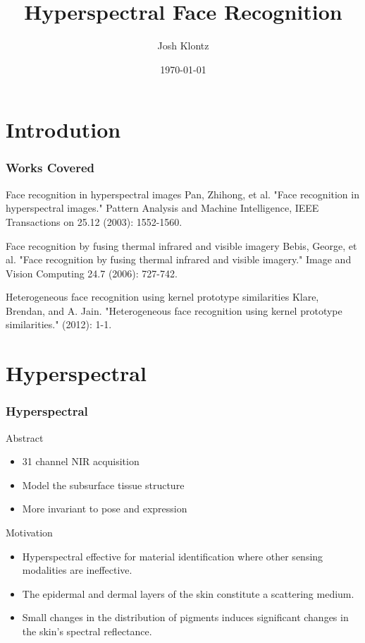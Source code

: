 \documentclass{beamer}
\title[Hyperspectral]{Hyperspectral Face Recognition}
\author{Josh Klontz}
\date{\today}
\begin{document}
\begin{frame}
\titlepage
\end{frame}

\section{Introdution}
\begin{frame}
\frametitle{Works Covered}
\begin{block}{Face recognition in hyperspectral images}
Pan, Zhihong, et al. "Face recognition in hyperspectral images." Pattern Analysis and Machine Intelligence, IEEE Transactions on 25.12 (2003): 1552-1560.
\end{block}
\pause
\begin{block}{Face recognition by fusing thermal infrared and visible imagery}
Bebis, George, et al. "Face recognition by fusing thermal infrared and visible imagery." Image and Vision Computing 24.7 (2006): 727-742.
\end{block}
\pause
\begin{block}{Heterogeneous face recognition using kernel prototype similarities}
Klare, Brendan, and A. Jain. "Heterogeneous face recognition using kernel prototype similarities." (2012): 1-1.
\end{block}
\end{frame}

\section{Hyperspectral}
\begin{frame}
\frametitle{Hyperspectral}
\begin{block}{Abstract}
\begin{itemize}
\item 31 channel NIR acquisition
\item Model the subsurface tissue structure
\item More invariant to pose and expression
\end{itemize}
\end{block}
\pause
\begin{block}{Motivation}
\begin{itemize}
\item Hyperspectral effective for material identification where other sensing modalities are ineffective.
\item The epidermal and dermal layers of the skin constitute a scattering medium.
\item Small changes in the distribution of pigments induces significant changes in the skin's spectral reflectance.
\end{itemize}
\end{block}
\end{frame}
\end{document}
